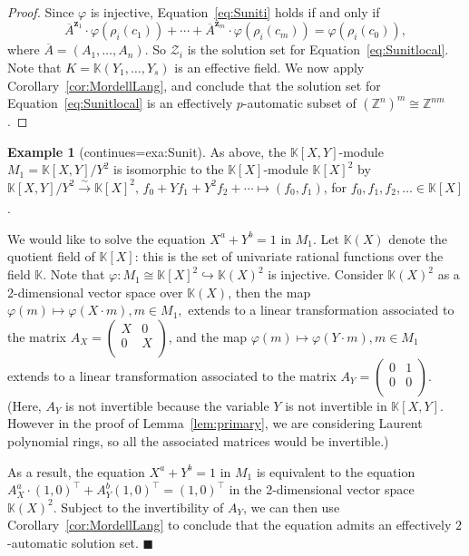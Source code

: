 \documentclass[a4paper,UKenglish,cleveref, autoref, thm-restate]{lipics-v2021}
\newcommand{\Z}{\mathbb{Z}}
\newcommand{\K}{\mathbb{K}}
\newcommand{\mZ}{\mathcal{Z}}
\newcommand{\bz}{\boldsymbol{z}}
\newcommand{\oA}{\overline{A}}
\theoremstyle{definition}
\theoremstyle{definition}
\newtheorem{exmpl}[thrm]{Example}
\theoremstyle{definition}
\begin{document}
\begin{proof}
    Since $\varphi$ is injective, Equation~\eqref{eq:Suniti} holds if and only if
    \begin{equation}\label{eq:Sunitlocal}
    \oA^{\bz_1} \cdot \varphi(\rho_i(c_1)) + \cdots + \oA^{\bz_m} \cdot \varphi(\rho_i(c_m)) = \varphi(\rho_i(c_0)),
    \end{equation}
    where $\oA = (A_1, \ldots, A_n)$.
    So $\mZ_i$ is the solution set for Equation~\eqref{eq:Sunitlocal}.
    Note that $K = \K(Y_1, \ldots, Y_s)$ is an effective field. We now apply Corollary~\ref{cor:MordellLang}, and conclude that the solution set for Equation~\eqref{eq:Sunitlocal} is an effectively $p$-automatic subset of $\left(\Z^{n}\right)^{m} \cong \Z^{nm}$. 
\end{proof}

\renewcommand\thmcontinues[1]{continued}
\begin{exmpl}[continues=exa:Sunit]
As above, the $\K[X, Y]$-module $M_1 = \K[X, Y]/Y^2$ is isomorphic to the $\K[X]$-module $\K[X]^2$ by $\K[X, Y]/Y^2 \xrightarrow[]{\sim} \K[X]^2, \, f_0 + Y f_1 + Y^2 f_2 + \cdots \mapsto (f_0, f_1)$, for $f_0, f_1, f_2, \ldots \in \K[X]$.

We would like to solve the equation $X^a + Y^b = 1$ in $M_1$.
Let $\K(X)$ denote the quotient field of $\K[X]$: this is the set of univariate rational functions over the field $\K$.
Note that $\varphi: M_1 \cong \K[X]^2 \hookrightarrow \K(X)^2$ is injective.
Consider $\K(X)^2$ as a 2-dimensional vector space over $\K(X)$, then the map $\varphi(m) \mapsto \varphi(X \cdot m), m \in M_1,$ extends to a linear transformation associated to the matrix 
$
A_X =
\begin{pmatrix}
    X & 0 \\
    0 & X \\
\end{pmatrix}
$,
and the map $\varphi(m) \mapsto \varphi(Y \cdot m), m \in M_1$ extends to a linear transformation associated to the matrix 
$
A_Y =
\begin{pmatrix}
    0 & 1 \\
    0 & 0 \\
\end{pmatrix}
$.
(Here, $A_Y$ is not invertible because the variable $Y$ is not invertible in $\K[X, Y]$. However in the proof of Lemma~\ref{lem:primary}, we are considering Laurent polynomial rings, so all the associated matrices would be invertible.)

As a result, the equation $X^a + Y^b = 1$ in $M_1$ is equivalent to the equation
$
A_X^a \cdot (1, 0)^{\top} + A_Y^b (1, 0)^{\top} = (1, 0)^{\top}
$
in the 2-dimensional vector space $\K(X)^2$.
Subject to the invertibility of $A_Y$, we can then use Corollary~\ref{cor:MordellLang} to conclude that the equation admits an effectively $2$-automatic solution set.
\hfill $\blacksquare$
\end{exmpl}
\end{document}
